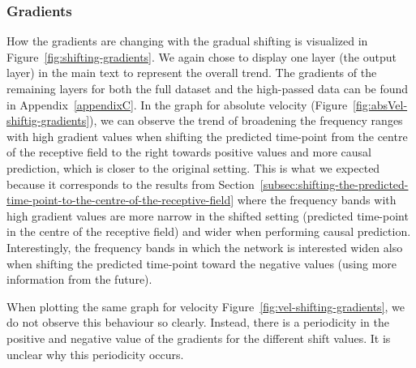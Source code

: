 \subsubsection{Gradients}\label{subsubsec:across-shiftig-gradients}
How the gradients are changing with the gradual shifting is visualized in Figure~\ref{fig:shifting-gradients}. 
We again chose to display one layer (the output layer) in the main text to represent the overall trend.
The gradients of the remaining layers for both the full dataset and the high-passed data can be found in Appendix~\ref{appendixC}.
In the graph for absolute velocity (Figure~\ref{fig:absVel-shiftig-gradients}), we can observe the trend of broadening the frequency ranges with high gradient values when shifting the predicted time-point from the centre of the receptive field to the right towards positive values and more causal prediction, which is closer to the original setting.
This is what we expected because it corresponds to the results from Section~\ref{subsec:shifting-the-predicted-time-point-to-the-centre-of-the-receptive-field} where the frequency bands with high gradient values are more narrow in the shifted setting (predicted time-point in the centre of the receptive field) and wider when performing causal prediction.
Interestingly, the frequency bands in which the network is interested widen also when shifting the predicted time-point toward the negative values (using more information from the future). 

When plotting the same graph for velocity Figure~\ref{fig:vel-shifting-gradients}, we do not observe this behaviour so clearly.
Instead, there is a periodicity in the positive and negative value of the gradients for the different shift values.
It is unclear why this periodicity occurs.


